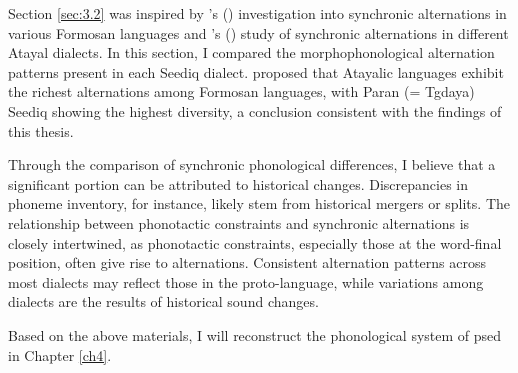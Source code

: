 Section \ref{sec:3.2} was inspired by \citeauthor{li1977morphophonemic}'s (\citeyear{li1977morphophonemic}) investigation into synchronic alternations in various Formosan languages and \citeauthor{goderich2020phd}'s (\citeyear{goderich2020phd}) study of synchronic alternations in different Atayal dialects. In this section, I compared the morphophonological alternation patterns present in each Seediq dialect. \textcite{li1977morphophonemic} proposed that Atayalic languages exhibit the richest alternations among Formosan languages, with Paran (= Tgdaya) Seediq showing the highest diversity, a conclusion consistent with the findings of this thesis.

Through the comparison of synchronic phonological differences, I believe that a significant portion can be attributed to historical changes. Discrepancies in phoneme inventory, for instance, likely stem from historical mergers or splits. The relationship between phonotactic constraints and synchronic alternations is closely intertwined, as phonotactic constraints, especially those at the word-final position, often give rise to alternations. Consistent alternation patterns across most dialects may reflect those in the proto-language, while variations among dialects are the results of historical sound changes.

Based on the above materials, I will reconstruct the phonological system of \acl{psed} in Chapter \ref{ch4}.


